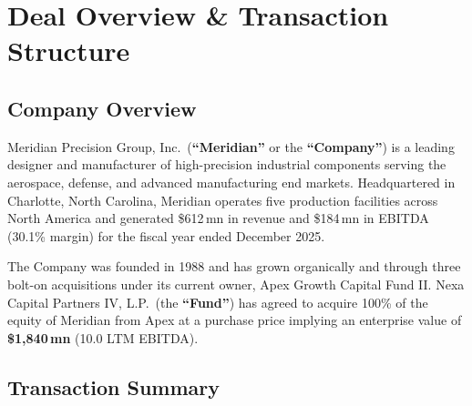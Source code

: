 
\section{Deal Overview \& Transaction Structure}

\subsection{Company Overview}

Meridian Precision Group, Inc.\ (\textbf{``Meridian''} or the \textbf{``Company''}) is a leading
designer and manufacturer of high-precision industrial components serving the aerospace, defense,
and advanced manufacturing end markets. Headquartered in Charlotte, North Carolina, Meridian
operates five production facilities across North America and generated \$612\,mn in revenue
and \$184\,mn in EBITDA (30.1\% margin) for the fiscal year ended December 2025.

The Company was founded in 1988 and has grown organically and through three bolt-on acquisitions
under its current owner, Apex Growth Capital Fund II. Nexa Capital Partners IV, L.P.\ (the
\textbf{``Fund''}) has agreed to acquire 100\% of the equity of Meridian from Apex at a purchase
price implying an enterprise value of \textbf{\$1,840\,mn} (10.0\texttimes{} LTM EBITDA).

\subsection{Transaction Summary}

